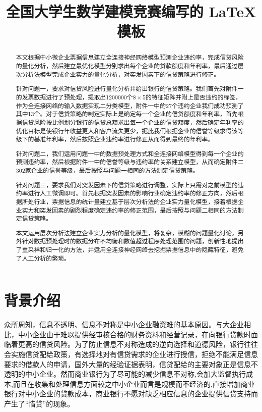 \documentclass{cumcmthesis}
\title{全国大学生数学建模竞赛编写的 \LaTeX{} 模板}
\begin{document}
 \maketitle
 \begin{abstract}
    本文根据中小微企业票据信息建立全连接神经网络模型预测企业违约率，完成信贷风险的量化分析，然后建立最优化模型分别求出每个企业的贷款额度和年利率，最后通过层次分析法模型完成企业实力的量化分析，对突发因素下的信贷策略进行修正。
    
    针对问题一，要求对信贷风险进行量化分析并给出银行的信贷策略。我们首先对附件一的发票数据进行了预处理，提取出1200000个$8 \times 5$的特征矩阵并附上是否违约的标签，作为全连接网络的输入数据实现二分类模型，附件一中的27个违约企业我们成功预测了其中13个。对于信贷策略的制定实际上是确定每一个企业的信贷额度和年利率，首先根据信贷风险按比例划分银行的信贷总额求出每一个企业的信贷额度，然后确定年利率的优化目标是使银行年收益更大和客户流失更少，据此我们根据企业的信誉等级求得该等级下的基准年利率，然后按照企业违约率进行修正从而得到最终的年利率。
    
    针对问题二，我们运用问题一中的数据预处理方式和全连接网络模型得到每一个企业的预测违约率，然后根据附件一中的信誉等级与违约率的关系建立模型，从而确定附件二302家企业的信誉等级，最后按照与问题一相同的方法制定信贷策略。
    
    针对问题三，要求我们对突发因素下的信贷策略进行调整，实际上只需对之前模型的违约率进行人工微调即可。首先根据突发因素的影响行业确定违约率的修正方向，然后根据所处行业，票据信息的统计量建立基于层次分析法的企业实力量化模型，接着根据企业实力和突发因素的剧烈程度确定违约率的修正范围，最后按照与问题二相同的方法制定信贷策略。
    
    本文运用层次分析法建立企业实力分析的量化模型，将复杂，模糊的问题量化讨论。另外针对数据预处理时的数据分布不均衡和数值超过程序处理范围的问题，创新性地提出了重采样和归一化的方法，并运用全连接神经网络去挖掘票据信息中的隐藏特征，避免了人工分析的繁琐。
    

\end{abstract}



\section{背景介绍}

众所周知，信息不透明、信息不对称是中小企业融资难的基本原因。与大企业相比，中小企业由于难以提供经审核合格的财务资料和经营记录，在向银行贷款时面临着更高的信贷风险。为了防止信息不对称造成的逆向选择和道德风险，银行往往会实施信贷配给政策，有选择地对有信贷需求的企业进行授信，拒绝不能满足信息要求的借款人的申请，国外大量的经验证据表明，信贷配给的主要对象正是信息不透明的中小企业。然而商业银行为了尽可能的减少信息不对称,会加大监督执行成本,而且在收集和处理信息方面较之中小企业而言是规模而不经济的,直接增加商业银行对中小企业的贷款成本，商业银行不愿对缺乏相应信息的企业提供信贷支持而产生了“惜贷”的现象。 \cite{ref1}
\end{document}
